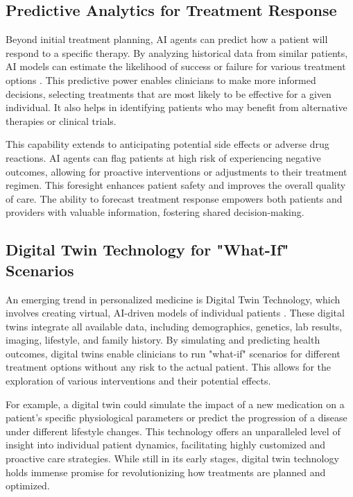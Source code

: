 \documentclass[12pt,a4paper]{article}
\begin{document}
\subsection{Predictive Analytics for Treatment Response}
\label{sec:treatment_response}
Beyond initial treatment planning, AI agents can predict how a patient will respond to a specific therapy. By analyzing historical data from similar patients, AI models can estimate the likelihood of success or failure for various treatment options \cite{wang2019deep}. This predictive power enables clinicians to make more informed decisions, selecting treatments that are most likely to be effective for a given individual. It also helps in identifying patients who may benefit from alternative therapies or clinical trials.

This capability extends to anticipating potential side effects or adverse drug reactions. AI agents can flag patients at high risk of experiencing negative outcomes, allowing for proactive interventions or adjustments to their treatment regimen. This foresight enhances patient safety and improves the overall quality of care. The ability to forecast treatment response empowers both patients and providers with valuable information, fostering shared decision-making.

\subsection{Digital Twin Technology for "What-If" Scenarios}
\label{sec:digital_twin}
An emerging trend in personalized medicine is Digital Twin Technology, which involves creating virtual, AI-driven models of individual patients \cite{dataart_digital_transformation}. These digital twins integrate all available data, including demographics, genetics, lab results, imaging, lifestyle, and family history. By simulating and predicting health outcomes, digital twins enable clinicians to run "what-if" scenarios for different treatment options without any risk to the actual patient. This allows for the exploration of various interventions and their potential effects.

For example, a digital twin could simulate the impact of a new medication on a patient's specific physiological parameters or predict the progression of a disease under different lifestyle changes. This technology offers an unparalleled level of insight into individual patient dynamics, facilitating highly customized and proactive care strategies. While still in its early stages, digital twin technology holds immense promise for revolutionizing how treatments are planned and optimized.
\end{document}
